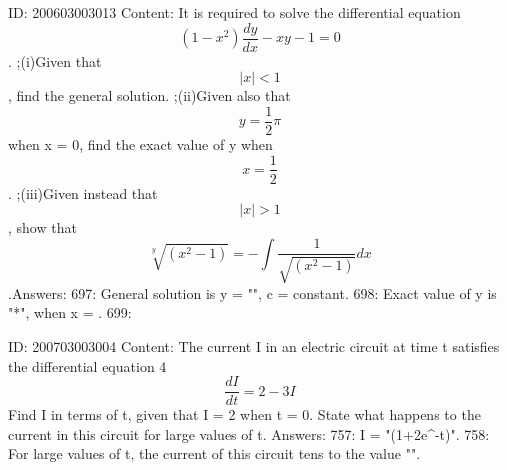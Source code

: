 \documentclass{article}
\begin{document}
ID: 200603003013
Content:
It is required to solve the differential equation $$(1-x^{2})\frac{dy}{dx}-xy-1=0$$. ;(i)Given that $$|x|<1$$, find the general solution. ;(ii)Given also that $$y= \frac{1}{2} \pi $$ when x = 0, find the exact value of y when $$x= \frac{1}{2} $$. ;(iii)Given instead that $$|x|>1$$, show that $$ \sqrt[y]{(x^{2}-1)} =- \int \frac{1}{\sqrt{(x^{2}-1)}} dx$$.Answers:
697: General solution is y = "", c = constant.
698: Exact value of y is "*\pi", when x = .
699: 

ID: 200703003004
Content:
The current I in an electric circuit at time t satisfies the differential equation 4$$\frac{dI}{dt}=2-3I$$  Find I in terms of t, given that I = 2 when t = 0.  State what happens to the current in this circuit for large values of t. Answers:
757: I = "(1+2e^{-t})".
758: For large values of t, the current of this circuit tens to the value "".
\end{document}
